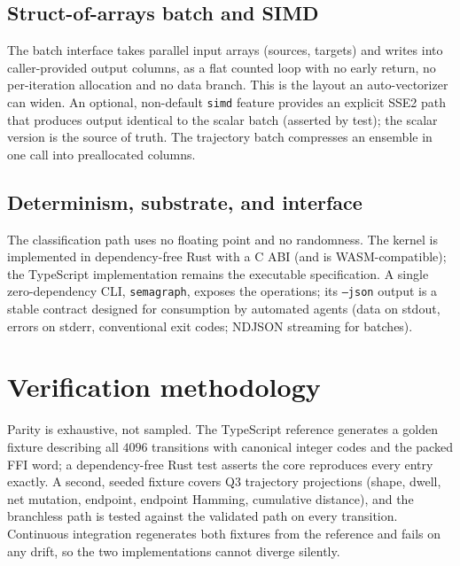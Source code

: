 \documentclass[11pt,a4paper]{article}
\begin{document}
\subsection{Struct-of-arrays batch and SIMD}
The batch interface takes parallel input arrays (sources, targets) and writes into
caller-provided output columns, as a flat counted loop with no early return, no
per-iteration allocation and no data branch. This is the layout an auto-vectorizer
can widen. An optional, non-default \texttt{simd} feature provides an explicit SSE2
path that produces output identical to the scalar batch (asserted by test); the
scalar version is the source of truth. The trajectory batch compresses an ensemble
in one call into preallocated columns.

\subsection{Determinism, substrate, and interface}
The classification path uses no floating point and no randomness. The kernel is
implemented in dependency-free Rust with a C ABI (and is WASM-compatible); the
TypeScript implementation remains the executable specification. A single
zero-dependency CLI, \texttt{semagraph}, exposes the operations; its \texttt{--json}
output is a stable contract designed for consumption by automated agents (data on
stdout, errors on stderr, conventional exit codes; NDJSON streaming for batches).

\section{Verification methodology}
Parity is exhaustive, not sampled. The TypeScript reference generates a golden
fixture describing all $4096$ transitions with canonical integer codes and the
packed FFI word; a dependency-free Rust test asserts the core reproduces every
entry exactly. A second, seeded fixture covers Q3 trajectory projections (shape,
dwell, net mutation, endpoint, endpoint Hamming, cumulative distance), and the
branchless path is tested against the validated path on every transition.
Continuous integration regenerates both fixtures from the reference and fails on
any drift, so the two implementations cannot diverge silently.
\end{document}

